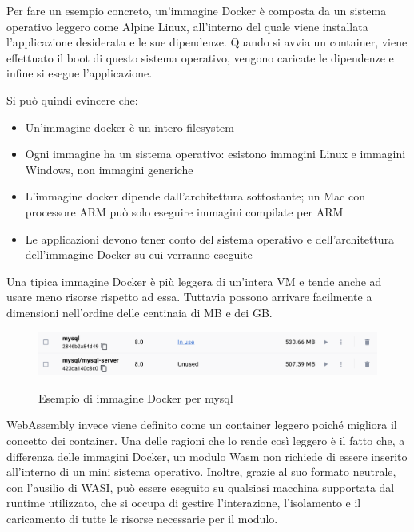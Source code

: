 Per fare un esempio concreto, un'immagine Docker è composta da un sistema operativo leggero come Alpine Linux,
all'interno del quale viene installata l'applicazione desiderata e le sue dipendenze. Quando si avvia un container,
viene effettuato il boot di questo sistema operativo, vengono caricate le dipendenze e infine si esegue l'applicazione.

Si può quindi evincere che:
\begin{itemize}
    \item Un'immagine docker è un intero filesystem
    \item Ogni immagine ha un sistema operativo: esistono immagini Linux e immagini Windows, non immagini generiche
    \item L'immagine docker dipende dall'architettura sottostante; un Mac con processore ARM può solo eseguire immagini
    compilate per ARM
    \item Le applicazioni devono tener conto del sistema operativo e dell'architettura dell'immagine Docker su cui
    verranno eseguite
\end{itemize}

Una tipica immagine Docker è più leggera di un'intera VM e tende anche ad usare meno risorse rispetto ad essa. Tuttavia
possono arrivare facilmente a dimensioni nell'ordine delle centinaia di MB e dei GB.

\begin{figure}[h]
    \centering
    \captionsetup{justification=centering}
    \includegraphics[width=15cm]{./chapters/2.wasi-in-depth/images/8.docker-images-size.png}
    \label{mysql_docker_image}
    \caption{Esempio di immagine Docker per mysql}
\end{figure}

WebAssembly invece viene definito come un container leggero poiché migliora il concetto dei container. Una delle ragioni
che lo rende così leggero è il fatto che, a differenza delle immagini Docker, un modulo Wasm non richiede di essere
inserito all'interno di un mini sistema operativo. Inoltre, grazie al suo formato neutrale, con l'ausilio di WASI, può
essere eseguito su qualsiasi macchina supportata dal runtime utilizzato, che si occupa di gestire l'interazione,
l'isolamento e il caricamento di tutte le risorse necessarie per il modulo.

